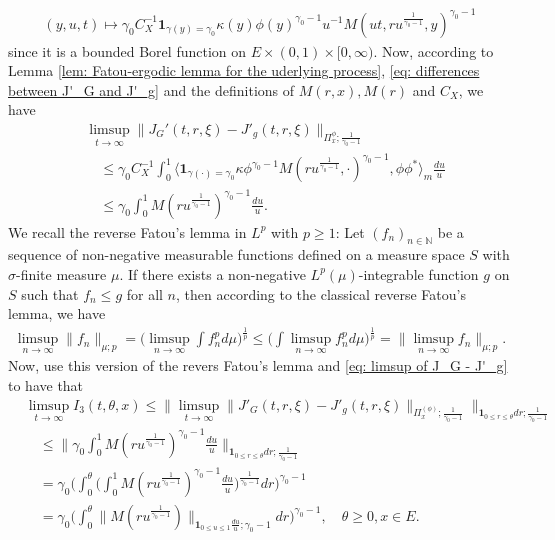 \documentclass[12pt,a4paper]{amsart}
\theoremstyle{definition}
\numberwithin{equation}{section}
\begin{document}
\begin{align}
	(y,u,t)
	\mapsto \gamma_0 C_X^{-1}\mathbf 1_{\gamma(y) = \gamma_0} \kappa(y)  \phi(y)^{\gamma_0 - 1}  u^{-1} M(ut,ru^{\frac{1}{\gamma_0 - 1}},y)^{\gamma_0 - 1}
\end{align}
since it is a bounded Borel function on $E\times (0,1) \times [0,\infty)$.
Now, according to Lemma \ref{lem: Fatou-ergodic lemma for the uderlying process}, \eqref{eq: differences between J'_G and J'_g} and the definitions of $M(r,x), M(r)$ and $C_X$, we have
\begin{align}\label{eq: limsup of J_G - J'_g}
	&\limsup_{t\to \infty} \| J_G'(t,r,\xi) - J'_g(t,r,\xi) \|_{\Pi_x^{\phi};\frac{1}{\gamma_0 - 1}}
	\\& \quad \leq  \gamma_0 C_X^{-1} \int_0^1 \big\langle \mathbf 1_{\gamma(\cdot) = \gamma_0} \kappa \phi^{\gamma_0 - 1} M(ru^{\frac{1}{\gamma_0 - 1}},\cdot)^{\gamma_0 - 1}, \phi\phi^* \big\rangle_m \frac{du}{u}
	\\& \quad \leq  \gamma_0  \int_0^1  M(ru^{\frac{1}{\gamma_0 - 1}})^{\gamma_0 - 1} \frac{du}{u}.
\end{align}
We recall the reverse Fatou's lemma in $L^p$ with $p\geq 1$: Let $(f_n)_{n\in \mathbb N}$ be a sequence of non-negative measurable functions defined on a measure space $S$ with $\sigma$-finite measure $\mu$. If there exists a non-negative $L^p(\mu)$-integrable function $g$ on $S$ such that $f_n \leq g$ for all $n$, then according to the classical reverse Fatou's lemma, we have
\begin{align}
	\limsup_{n\to \infty}\big\| f_n \big\|_{\mu;p}
	= \Big (   \limsup_{n\to \infty}  \int f^p_n d\mu        \Big)^{\frac{1}{p}}
	\leq  \Big (   \int \limsup_{n\to \infty} f^p_n d\mu        \Big)^{\frac{1}{p}}
	= \big\| \limsup_{n\to \infty} f_n \big\|_{\mu;p}.
\end{align}
Now, use this version of the revers Fatou's lemma and \eqref{eq: limsup of J_G - J'_g} to have that
\begin{align}
	&\limsup_{t\to \infty} I_3(t,\theta, x)
   \leq \big\| \limsup_{t\to \infty} \|    J'_G(t,r,\xi) - J'_g(t,r,\xi) \|_{\Pi_x^{(\phi)};\frac{1}{\gamma_0 - 1}} \big\|_{\mathbf 1_{0\leq r\leq \theta} dr;\frac{1}{\gamma_0 - 1}}
	\\&\quad\leq \Big\| \gamma_0  \int_0^1  M(ru^{\frac{1}{\gamma_0 - 1}})^{\gamma_0 - 1} \frac{du}{u} \Big\|_{\mathbf 1_{0\leq r\leq \theta} dr;\frac{1}{\gamma_0 - 1}}
	\\&\quad = \gamma_0 \bigg( \int_0^\theta \Big (   \int_0^1  M(ru^{\frac{1}{\gamma_0 - 1}})^{\gamma_0 - 1} \frac{du}{u}   \Big )^{\frac{1}{\gamma_0 - 1}} dr \bigg)^{\gamma_0 - 1}
	\\&\quad = \gamma_0 \Big(  \int_0^\theta  \| M(r u^{\frac{1}{\gamma_0 - 1}}) \|_{\mathbf 1_{0\leq u\leq 1}\frac{du}{u};\gamma_0 - 1}  dr\Big)^{\gamma_0 - 1},
	\quad \theta \geq 0, x\in E.
\end{align}
	
\end{document}
